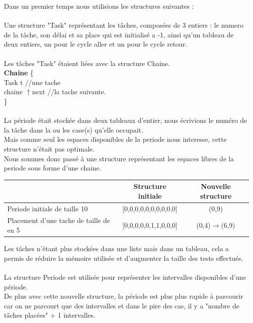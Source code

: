 \documentclass[11pt]{article}
\begin{document}
Dans un premier temps nous utilisions les structures suivantes :\\\\
Une structure "Task" représentant les tâches, composées de 3 entiers : le numero de la tâche, son délai et sa place qui est initialisé a -1, ainsi qu'un tableau de deux entiers, un pour le cycle aller et un pour le cycle retour.\\ 
\\
Les tâches "Task" étaient liées avec la structure Chaine.\\
\indent \textbf{Chaine} \{ \\
    \indent \indent Task t   \indent \indent \indent //une tache\\
    \indent \indent chaine $\uparrow$next \indent //la tache suivante.\\
\indent\}
\\\\
\indent La période était stockée dans deux tableaux d'entier, nous écrivions le numéro de la tâche dans la ou les case(s) qu'elle occupait.\\
Mais comme seul les espaces disponibles de la periode nous interesse, cette structure n'était pas optimale.\\
Nous sommes donc passé à une structure représentant les espaces libres de la periode sous forme d'une chaine.
\begin{center}
    \begin{tabular}{|l|c|c|}			
    \hline                                              & \textbf{Structure initiale}   & \textbf{Nouvelle structure} \\
    \hline 	Periode initiale de taille 10               & [0,0,0,0,0,0,0,0,0,0]         &(0,9)		     \\
    \hline 	Placement d'une tache de taille de en 5 	& [0,0,0,0,0,1,1,0,0,0] 		& (0,4)$\rightarrow$(6,9)   \\
    \hline
    \end{tabular}\vspace{1em}
\end{center}
\noindent Les tâches n'étant plus stockées dans une liste mais dans un tableau, cela a permis de réduire la mémoire utilisée et d'augmenter la taille des tests effectués.\\\\
La structure Periode est utilisée pour représenter les intervalles disponibles d'une période.\\
De plus avec cette nouvelle structure, la période est plus plus rapide à parcourir car on ne parcourt que des intervalles et dans le pire des cas, il y a "nombre de tâches placées" + 1 intervalles.\\
\end{document}
